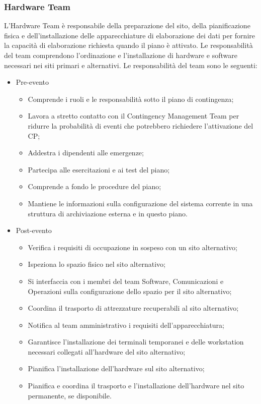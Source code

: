 \documentclass[12pt, a4paper, titlepage]{report}
\begin{document}
			\subsubsection{Hardware Team}
			L'Hardware Team è responsabile della preparazione del sito, della pianificazione fisica e dell'installazione delle apparecchiature di elaborazione dei dati per fornire la capacità di elaborazione richiesta quando il piano è attivato. Le responsabilità del team comprendono l'ordinazione e l'installazione di hardware e software necessari nei siti primari e alternativi.
			Le responsabilità del team sono le seguenti:
			\begin{itemize}
				\item Pre-evento
				\begin{itemize}
					\item Comprende i ruoli e le responsabilità sotto il piano di contingenza;
					\item Lavora a stretto contatto con il Contingency Management Team per ridurre la probabilità di eventi che potrebbero richiedere l'attivazione del CP;
					\item Addestra i dipendenti alle emergenze;
					\item Partecipa alle esercitazioni e ai test del piano;
					\item Comprende a fondo le procedure del piano;
					\item Mantiene le informazioni sulla configurazione del sistema corrente in una struttura di archiviazione esterna e in questo piano.
				\end{itemize}
				\item Post-evento
				\begin{itemize}
					\item Verifica i requisiti di occupazione in sospeso con un sito alternativo;
					\item Ispeziona lo spazio fisico nel sito alternativo;
					\item Si interfaccia con i membri del team Software, Comunicazioni e Operazioni sulla configurazione dello spazio per il sito alternativo;
					\item Coordina il trasporto di attrezzature recuperabili al sito alternativo;
					\item Notifica al team amministrativo i requisiti dell'apparecchiatura;
					\item Garantisce l'installazione dei terminali temporanei e delle workstation necessari collegati all'hardware del sito alternativo;
					\item Pianifica l'installazione dell'hardware sul sito alternativo;
					\item Pianifica e coordina il trasporto e l'installazione dell'hardware nel sito permanente, se disponibile.
				\end{itemize}
			\end{itemize}
\end{document}
